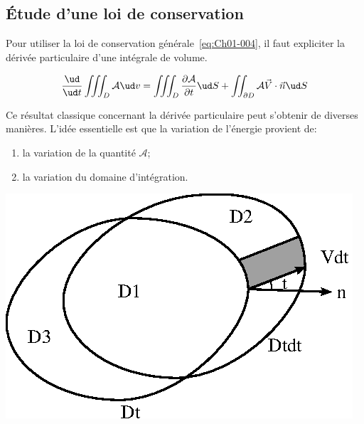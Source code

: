 \subsection{Étude d'une loi de conservation} \label{ssec:Ch01-1.2}
Pour utiliser la loi de conservation générale~\eqref{eq:Ch01-004}, il faut expliciter la dérivée particulaire d'une intégrale de volume.

\begin{lem}\label{lem:Ch01-1}
    \begin{equation}
        \frac{\ud}{\ud t}\iiint_D \mathcal{A} \ud v =\iiint_D\frac{\partial \mathcal{A}}{\partial t}\ud S+\iint_{\partial D}\mathcal{A}\vec{V}\cdot\vec{n}\ud S
        \label{eq:Ch01-005}
    \end{equation}
\end{lem}

\begin{multicols}{2}
    \raggedcolumns
    \setcounter{unbalance}{2}
Ce résultat classique concernant la dérivée particulaire peut s'obtenir de diverses manières.
L'idée essentielle est que la variation de l'énergie provient de:
\begin{enumerate}
    \item la variation de la quantité $\mathcal{A}$;
    \item la variation du domaine d'intégration.
\end{enumerate}
\columnbreak
\begin{center}
    \includegraphics[scale=0.9]{../images/T1_Ch01-0002.eps}
\end{center}
\end{multicols}

